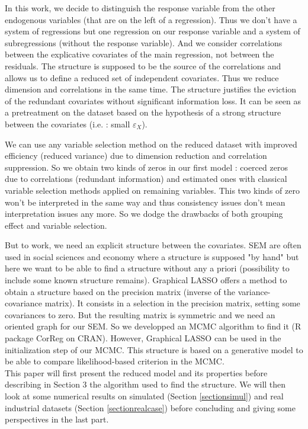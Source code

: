 \documentclass[11pt,a4paper]{article}
\begin{document}
 	
	  In this work, we decide to distinguish the response variable from the other endogenous variables (that are on the left of a regression). Thus we don't have a system of regressions but one regression on our response variable and a system of subregressions (without the response variable). And we consider correlations between the explicative covariates of the main regression, not between the residuals.
	  The structure is supposed to be the source of the correlations and allows us to define a reduced set of independent covariates. Thus we reduce dimension and correlations in the same time. The structure justifies the eviction of the redundant covariates without significant information loss. It can be seen as a pretreatment on the dataset based on the hypothesis of a strong structure between the covariates (i.e. : small $\varepsilon_X$).
	  
	We can use any variable selection method on the reduced dataset with improved efficiency (reduced variance) due to dimension reduction and correlation suppression. So we obtain two kinds of zeros in our first model : coerced zeros due to correlations (redundant information) and estimated ones with classical variable selection methods applied on remaining variables. This two kinds of zero won't be interpreted in the same way and thus consistency issues don't mean interpretation issues any more. So we dodge the drawbacks of both grouping effect and variable selection.
 	 	
But to work, we need an explicit structure between the covariates. SEM are often used in social sciences and economy where a structure is supposed "by hand" but here we want to be able to find a structure without any a priori (possibility to include some known structure remains). Graphical LASSO \cite{friedman2008sparse} offers a method to obtain a structure based on the precision matrix (inverse of the variance-covariance matrix). It consists in a selection in the precision matrix, setting some covariances to zero. But the resulting matrix is symmetric and we need an oriented graph for our SEM. So we developped an MCMC algorithm to find it (R package CorReg on CRAN). However, Graphical LASSO can be used in the initialization step of our MCMC. This structure is based on a generative model to be able to compare likelihood-based criterion in the MCMC.
 	\\
 	
 	This paper will first present the reduced model and its properties before describing in Section 3 the algorithm used to find the structure.
 	We will then look at some numerical results on simulated (Section \ref{sectionsimul}) and real industrial datasets (Section \ref{sectionrealcase}) before concluding and giving some perspectives in the last part.
	
\end{document}
